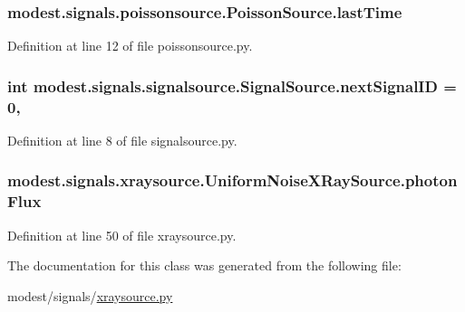 \subsubsection[{\texorpdfstring{last\+Time}{lastTime}}]{\setlength{\rightskip}{0pt plus 5cm}modest.\+signals.\+poissonsource.\+Poisson\+Source.\+last\+Time\hspace{0.3cm}{\ttfamily [inherited]}}\hypertarget{classmodest_1_1signals_1_1poissonsource_1_1PoissonSource_a34395fc83bd8743a0a5ee69f9392a606}{}\label{classmodest_1_1signals_1_1poissonsource_1_1PoissonSource_a34395fc83bd8743a0a5ee69f9392a606}


Definition at line 12 of file poissonsource.\+py.

\subsubsection[{\texorpdfstring{next\+Signal\+ID}{nextSignalID}}]{\setlength{\rightskip}{0pt plus 5cm}int modest.\+signals.\+signalsource.\+Signal\+Source.\+next\+Signal\+ID = 0\hspace{0.3cm}{\ttfamily [static]}, {\ttfamily [inherited]}}\hypertarget{classmodest_1_1signals_1_1signalsource_1_1SignalSource_a453eafb550b551adbec0903deb63dfce}{}\label{classmodest_1_1signals_1_1signalsource_1_1SignalSource_a453eafb550b551adbec0903deb63dfce}


Definition at line 8 of file signalsource.\+py.

\subsubsection[{\texorpdfstring{photon\+Flux}{photonFlux}}]{\setlength{\rightskip}{0pt plus 5cm}modest.\+signals.\+xraysource.\+Uniform\+Noise\+X\+Ray\+Source.\+photon\+Flux}\hypertarget{classmodest_1_1signals_1_1xraysource_1_1UniformNoiseXRaySource_a9b8049972baf6e0640181b58850a3d20}{}\label{classmodest_1_1signals_1_1xraysource_1_1UniformNoiseXRaySource_a9b8049972baf6e0640181b58850a3d20}


Definition at line 50 of file xraysource.\+py.



The documentation for this class was generated from the following file\+:\begin{DoxyCompactItemize}
\item 
modest/signals/\hyperlink{xraysource_8py}{xraysource.\+py}\end{DoxyCompactItemize}
